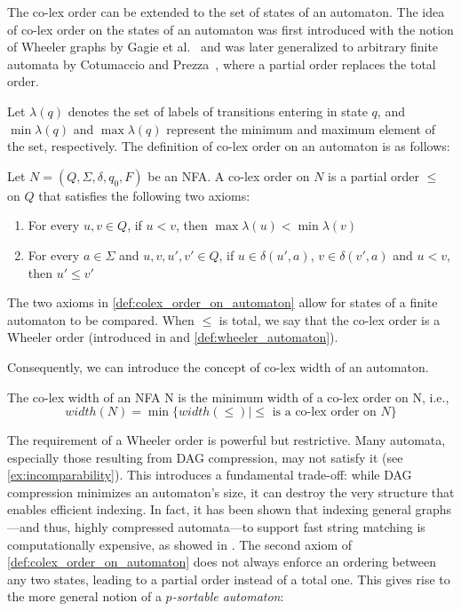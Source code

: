 The co-lex order can be extended to the set of states of an automaton. The idea of co-lex order on the states of an automaton was first introduced with the notion of Wheeler graphs by Gagie et al.~\cite{gagie2017wheeler} and was later generalized to arbitrary finite automata by Cotumaccio and Prezza~\cite{cotumaccio2021indexing}, where a partial order replaces the total order. 

Let $\lambda(q)$ denotes the set of labels of transitions entering in state $q$, and $\min\lambda(q)$ and $\max\lambda(q)$ represent the minimum and maximum element of the set, respectively. The definition of co-lex order on an automaton is as follows:
\begin{definition}
    \label{def:colex_order_on_automaton}
    Let $N = (Q, \Sigma, \delta, q_0, F)$ be an NFA. A co-lex order on $N$ is a partial order $\leq$ on $Q$ that satisfies the following two axioms:
    \begin{enumerate}
        \item For every $u, v \in Q$, if $u < v$, then $\max\lambda(u) < \min\lambda(v)$
        \item For every $a \in \Sigma$ and $u, v, u', v' \in Q$, if $u \in \delta(u', a)$, $v \in \delta(v', a)$ and $u < v$, then $u' \leq v'$
    \end{enumerate}
\end{definition}

The two axioms in \cref{def:colex_order_on_automaton} allow for states of a finite automaton to be compared. When $\leq$ is total, we say that the co-lex order is a Wheeler order (introduced in \cite{gagie2017wheeler} and \cref{def:wheeler_automaton}). 

Consequently, we can introduce the concept of co-lex width of an automaton.
\begin{definition}
    The co-lex width of an NFA N is the minimum width of a co-lex order on N, i.e.,
    $$
        width(N) = \min \{width(\leq)|\leq \text{ is a co-lex order on } N\}
    $$
\end{definition}

The requirement of a Wheeler order is powerful but restrictive. Many automata, especially those resulting from DAG compression, may not satisfy it (see \cref{ex:incomparability}). This introduces a fundamental trade-off: while DAG compression minimizes an automaton's size, it can destroy the very structure that enables efficient indexing. In fact, it has been shown that indexing general graphs—and thus, highly compressed automata—to support fast string matching is computationally expensive, as showed in \cite{equiGraphsCannotBe2023}. The second axiom of \cref{def:colex_order_on_automaton} does not always enforce an ordering between any two states, leading to a partial order instead of a total one. This gives rise to the more general notion of a \textit{$p$-sortable automaton}: 

